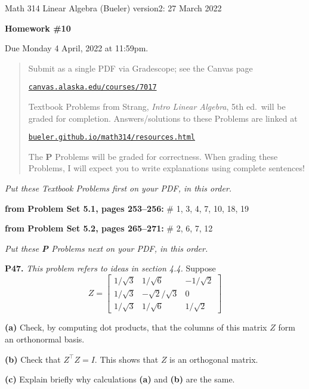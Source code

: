\documentclass[12pt]{amsart}
\newcommand{\prob}[1]{\bigskip\noindent\textbf{#1.}\quad }
\newcommand{\probset}[2]{\bigskip\noindent\textbf{from Problem Set #1, pages #2:}\quad }
\newcommand{\epart}[1]{\medskip\noindent\textbf{(#1)}\quad }
\begin{document}
\scriptsize \noindent Math 314 Linear Algebra (Bueler) \hfill version2: 27 March 2022
\normalsize\medskip

\Large
\centerline{\textbf{Homework \#10}}

\bigskip
\large
\centerline{Due Monday 4 April, 2022 at 11:59pm.}

\normalsize
\bigskip
\begin{quote}
\medskip
\noindent Submit as a single PDF via Gradescope; see the Canvas page

\href{https://canvas.alaska.edu/courses/7017}{\texttt{canvas.alaska.edu/courses/7017}}

\noindent Textbook Problems from Strang, \emph{Intro Linear Algebra}, 5th ed.~will be graded for completion.  Answers/solutions to these Problems are linked at

\href{https://bueler.github.io/math314/resources.html}{\texttt{bueler.github.io/math314/resources.html}}

\noindent The \textbf{P} Problems will be graded for correctness.  When grading these Problems, I will expect you to write explanations using complete sentences!
\end{quote}
\medskip

\thispagestyle{empty}

\noindent \hrulefill

\noindent \emph{Put these Textbook Problems first on your PDF, in this order.}

\probset{5.1}{253--256} \# 1, 3, 4, 7, 10, 18, 19

\probset{5.2}{265--271} \# 2, 6, 7, 12


\bigskip
\noindent \hrulefill

\noindent \emph{Put these \textbf{P} Problems next on your PDF, in this order.}

\prob{P47} \emph{This problem refers to ideas in section 4.4.} \quad Suppose
  $$Z = \begin{bmatrix} 1/\sqrt{3} & 1/\sqrt{6} & -1/\sqrt{2} \\ 1/\sqrt{3} & -\sqrt{2}/\sqrt{3} & 0 \\ 1/\sqrt{3} & 1/\sqrt{6} & 1/\sqrt{2} \end{bmatrix}$$

\epart{a}  Check, by computing dot products, that the columns of this matrix $Z$ form an orthonormal basis.

\epart{b}  Check that $Z^\top Z = I$.  This shows that $Z$ is an orthogonal matrix.

\epart{c}  Explain briefly why calculations \textbf{(a)} and \textbf{(b)} are the same.
\end{document}
